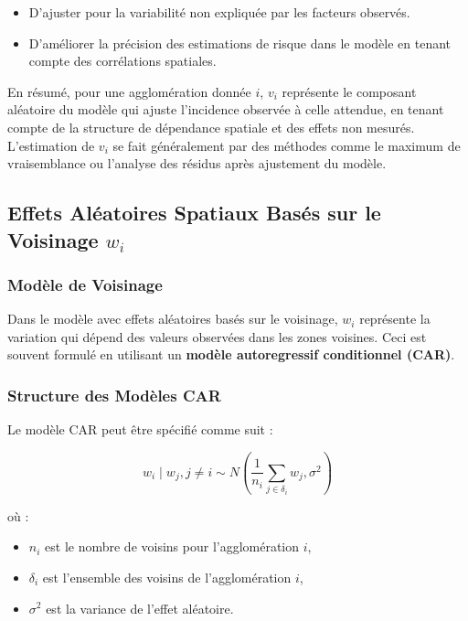 \documentclass[
]{article}
\providecommand{\tightlist}{%
  \setlength{\itemsep}{0pt}\setlength{\parskip}{0pt}}
\begin{document}
\begin{itemize}
\tightlist
\item
  D'ajuster pour la variabilité non expliquée par les facteurs observés.
\item
  D'améliorer la précision des estimations de risque dans le modèle en
  tenant compte des corrélations spatiales.
\end{itemize}

En résumé, pour une agglomération donnée \(i\), \(v_i\) représente le
composant aléatoire du modèle qui ajuste l'incidence observée à celle
attendue, en tenant compte de la structure de dépendance spatiale et des
effets non mesurés. L'estimation de \(v_i\) se fait généralement par des
méthodes comme le maximum de vraisemblance ou l'analyse des résidus
après ajustement du modèle.

\subsection{\texorpdfstring{Effets Aléatoires Spatiaux Basés sur le
Voisinage
\(w_i\)}{Effets Aléatoires Spatiaux Basés sur le Voisinage w\_i}}\label{effets-aluxe9atoires-spatiaux-basuxe9s-sur-le-voisinage-w_i}

\subsubsection{Modèle de Voisinage}\label{moduxe8le-de-voisinage}

Dans le modèle avec effets aléatoires basés sur le voisinage, \(w_i\)
représente la variation qui dépend des valeurs observées dans les zones
voisines. Ceci est souvent formulé en utilisant un \textbf{modèle
autoregressif conditionnel (CAR)}.

\subsubsection{Structure des Modèles
CAR}\label{structure-des-moduxe8les-car}

Le modèle CAR peut être spécifié comme suit :

\[
w_i \mid w_j, j \neq i \sim N \left( \frac{1}{n_i} \sum_{j \in \delta_i} w_j, \sigma^2 \right)
\]

où :

\begin{itemize}
\tightlist
\item
  \(n_i\) est le nombre de voisins pour l'agglomération \(i\),
\item
  \(\delta_i\) est l'ensemble des voisins de l'agglomération \(i\),
\item
  \(\sigma^2\) est la variance de l'effet aléatoire.
\end{itemize}
\end{document}
